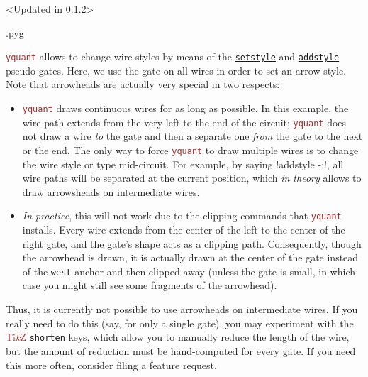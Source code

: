 \documentclass{scrartcl}
\makeatletter
\newenvironment{codeexample}{%
   \VerbatimEnvironment%
   \let\FVB@VerbatimOut\minted@FVB@VerbatimOut
   \let\FVE@VerbatimOut\minted@FVE@VerbatimOut
   \minted@configlang{tex}%
   \minted@fvset
   \begin{VerbatimOut}[codes={\catcode`\^^I=12},firstline,lastline]{\minted@jobname.pyg}%
}{
   \end{VerbatimOut}%
   \minted@langlinenoson%
   \savebox\codeexamplebox{ \minted@jobname.pyg}%
   \ifdim\wd\codeexamplebox>\dimexpr.5\linewidth-3mm\relax%
      \wd\codeexamplebox=.5\linewidth%
   \else%
      \wd\codeexamplebox=\dimexpr\wd\codeexamplebox+3mm\relax%
   \fi%
   \noindent\begin{minipage}{\wd\codeexamplebox}%
      \centering%
      \usebox\codeexamplebox%
   \end{minipage}%
   \begin{minipage}{\dimexpr\linewidth-\wd\codeexamplebox\relax}%
      \minted@pygmentize{\minted@lang}%
   \end{minipage}%
   \minted@langlinenosoff%
   \par%
}
\def\TikZ{\textcolor{brown}{Ti\textit kZ}}
\def\pkg#1{\textcolor{brown}{\texttt{#1}}}
\def\gate#1{\hyperref[gate:#1]{\texttt{#1}}}
\def\Yquant{\pkg{yquant}}
\makeatother
\begin{document}
               \begin{example}<Updated in 0.1.2>
                  \begin{codeexample}
                  \end{codeexample}
                  \Yquant{} allows to change wire styles by means of the \gate{setstyle} and \gate{addstyle} pseudo\hyp gates.
                  Here, we use the gate on all wires in order to set an arrow style.
                  Note that arrowheads are actually very special in two respects:
                  \begin{itemize}
                     \item \Yquant{} draws continuous wires for as long as possible.
                        In this example, the wire path extends from the very left to the end of the circuit; \Yquant{} does not draw a wire \emph{to} the gate and then a separate one \emph{from} the gate to the next or the end.
                        The only way to force \Yquant{} to draw multiple wires is to change the wire style or type mid\hyp circuit.
                        For example, by saying \yquant!addstyle {} -;!, all wire paths will be separated at the current position, which \emph{in theory} allows to draw arrowsheads on intermediate wires.
                     \item \emph{In practice}, this will not work due to the clipping commands that \Yquant{} installs.
                        Every wire extends from the center of the left to the center of the right gate, and the gate's shape acts as a clipping path.
                        Consequently, though the arrowhead is drawn, it is actually drawn at the center of the gate instead of the \texttt{west} anchor and then clipped away (unless the gate is small, in which case you might still see some fragments of the arrowhead).
                  \end{itemize}
                  Thus, it is currently not possible to use arrowheads on intermediate wires.
                  If you really need to do this (say, for only a single gate), you may experiment with the \TikZ{} \texttt{shorten} keys, which allow you to manually reduce the length of the wire, but the amount of reduction must be hand\hyp computed for every gate.
                  If you need this more often, consider filing a feature request.
               \end{example}
\end{document}
